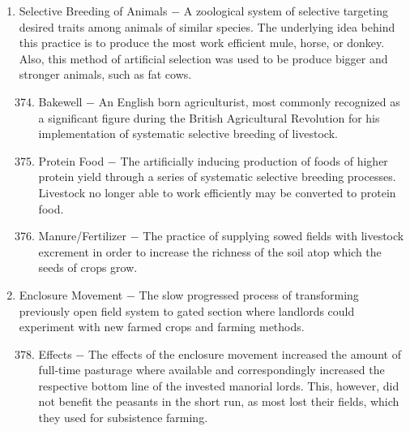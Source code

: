 \documentclass[12pt]{article}
\begin{document}
\begin{enumerate}
\begin{enumerate}[label=\arabic{*}.]
\end{enumerate}
\setcounter{enumi}{372}

\item Selective Breeding of Animals $-$ A zoological system of selective targeting desired traits among animals of similar species. The underlying idea behind this practice is to produce the most work efficient mule, horse, or donkey. Also, this method of artificial selection was used to be produce bigger and stronger animals, such as fat cows.

\begin{enumerate}[label=\arabic{*}.]
\setcounter{enumii}{373}

\item Bakewell $-$ An English born agriculturist, most commonly recognized as a significant figure during the British Agricultural Revolution for his implementation of systematic selective breeding of livestock.

\item Protein Food $-$ The artificially inducing production of foods of higher protein yield through a series of systematic selective breeding processes. Livestock no longer able to work efficiently may be converted to protein food.

\item Manure/Fertilizer $-$ The practice of supplying sowed fields with livestock excrement in order to increase the richness of the soil atop which the seeds of crops grow.

\end{enumerate}
\setcounter{enumi}{376}

\item Enclosure Movement $-$ The slow progressed process of transforming previously open field system to gated section where landlords could experiment with new farmed crops and farming methods.

\begin{enumerate}[label=\arabic{*}.]
\setcounter{enumii}{377}

\item Effects $-$ The effects of the enclosure movement increased the amount of full-time pasturage where available and correspondingly increased the respective bottom line of the invested manorial lords. This, however, did not benefit the peasants in the short run, as most lost their fields, which they used for subsistence farming.

\end{enumerate}
\setcounter{enumi}{378}


\end{enumerate}
\end{document}
